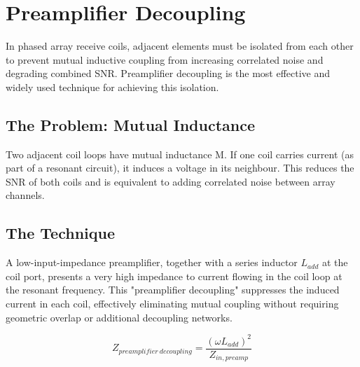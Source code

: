 \section{Preamplifier Decoupling}\label{sec:wiki_preamplifier_decoupling}



In phased array receive coils, adjacent elements must be isolated from each other to prevent mutual inductive coupling from increasing correlated noise and degrading combined SNR. Preamplifier decoupling is the most effective and widely used technique for achieving this isolation.

				

\subsection{The Problem: Mutual Inductance}

				

Two adjacent coil loops have mutual inductance M. If one coil carries current (as part of a resonant circuit), it induces a voltage in its neighbour. This reduces the SNR of both coils and is equivalent to adding correlated noise between array channels.


				

\subsection{The Technique}

				


				

A low-input-impedance preamplifier, together with a series inductor $L_{add}$ at the coil port, presents a very high impedance to current flowing in the coil loop at the resonant frequency. This "preamplifier decoupling" suppresses the induced current in each coil, effectively eliminating mutual coupling without requiring geometric overlap or additional decoupling networks.

				
\[Z_{preamplifier\ decoupling} = \dfrac{(\omega L_{add})^2}{Z_{in,preamp}}\]

